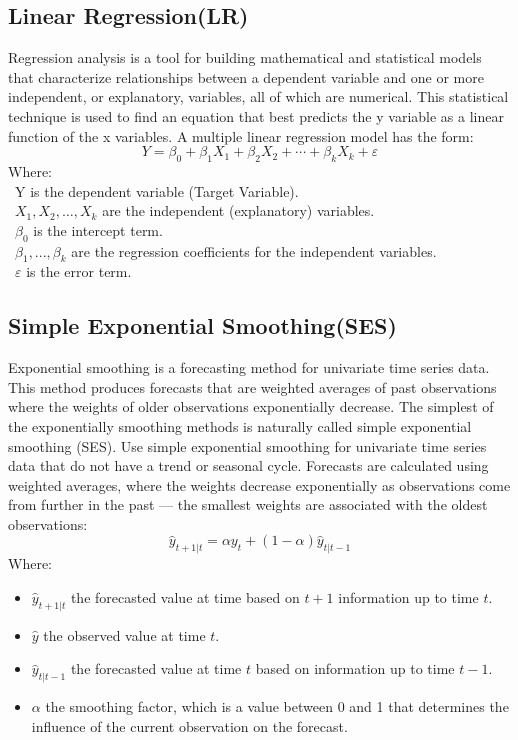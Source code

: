 \documentclass{ieeeojies}
\begin{document}
\subsection{Linear Regression(LR)}
Regression analysis is a tool for building mathematical and statistical models that characterize relationships between a dependent variable and one or more independent, or explanatory, variables, all of which are numerical. This statistical technique is used to find an equation that best predicts the y variable as a linear function of the x variables.
A multiple linear regression model has the form:
\[Y=\beta_0+\beta_1X_1+\beta_2X_2+\cdots+\beta_kX_k+\varepsilon\]
Where:\\
\indent\textbullet\ Y is the dependent variable (Target Variable).\\
\indent\textbullet\ \(X_1, X_2, \ldots, X_k\) are the independent (explanatory) variables.\\
\indent\textbullet\ \(\beta_0\) is the intercept term.\\
\indent\textbullet\ \(\beta_1,..., \beta_k\) are the regression coefficients for the independent variables.\\
\indent\textbullet\ \(\varepsilon\) is the error term. \cite{b38, b39}

\subsection{Simple Exponential Smoothing(SES)}
Exponential smoothing is a forecasting method for univariate time series data. This method produces forecasts that are weighted averages of past observations where the weights of older observations exponentially decrease. The simplest of the exponentially smoothing methods is naturally called simple exponential smoothing (SES). Use simple exponential smoothing for univariate time series data that do not have a trend or seasonal cycle.
Forecasts are calculated using weighted averages, where the weights decrease exponentially as observations come from further in the past — the smallest weights are associated with the oldest observations:
\[
  \hat{y}_{t+1|t} = \alpha y_t + (1 - \alpha) \hat{y}_{t|t-1}
\]
Where:
\begin{itemize}
  \item \(\hat{y}_{t+1|t}\) the forecasted value at time based on \({t+1}\) information up to time \({t}\).
  \item \(\hat{y}\) the observed value at time \({t}\).
  \item \(\hat{y}_{t|t-1}\) the forecasted value at time \({t}\) based on information up to time \({t-1}\).
  \item \(\alpha\) the smoothing factor, which is a value between 0 and 1 that determines the influence of the current observation on the forecast. \cite{b26,b27}
\end{itemize}
\end{document}
